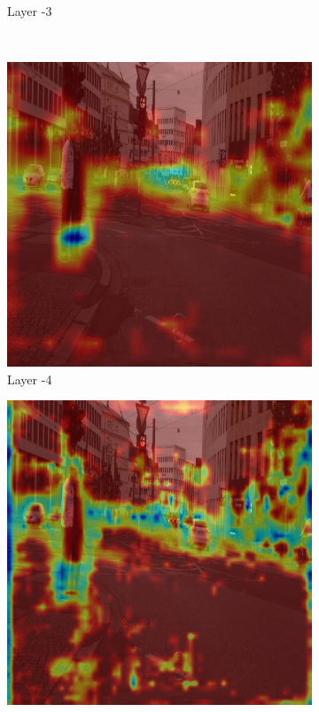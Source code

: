 \begin{figure}[h]
\begin{subfigure}[b]{0.47\textwidth}
        \caption{Layer -3}
        \label{fig:-3}
    \end{subfigure}\\
    \hfill
    \begin{subfigure}[b]{0.49\textwidth}
        \centering
        \includegraphics[width=\textwidth]{figures/bonn_000035_000019_leftImg8bit.pnglayer-4/bonn_000035_000019_leftImg8bit.png_object(0)_heatmap}
        \caption{Layer -4}
        \label{fig:-4}
    \end{subfigure}
    \hfill
    \begin{subfigure}[b]{0.49\textwidth}
        \centering
        \includegraphics[width=\textwidth]{figures/bonn_000035_000019_leftImg8bit.pnglayer-5/bonn_000035_000019_leftImg8bit.png_object(0)_heatmap}

\end{subfigure}
\end{figure}

